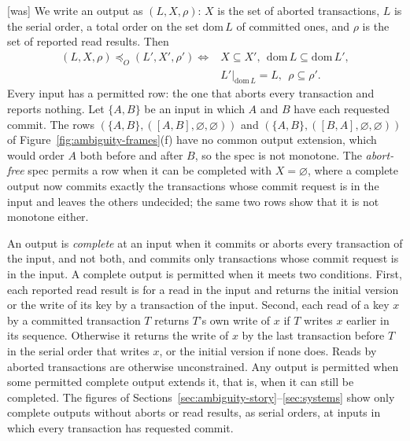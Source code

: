 \documentclass[sigconf]{cidr-2027}
\theoremstyle{remark}
\newcommand{\OutputOrd}{\preceq_O}
\newcommand{\outrel}{extends\xspace}          %
\newcommand{\outnoun}{output extension\xspace}%
\begin{document}
{\footnotesize\color{black!50}\noindent\textsf{[was]} We write an output as $(L,X,\rho)$: $X$ is the set of aborted transactions, $L$
is the serial order, a total order on the set $\mathrm{dom}\,L$ of committed
ones, and $\rho$ is the set of reported read results.  Then
\[
  \begin{aligned}
  (L,X,\rho)\OutputOrd(L',X',\rho')
  \iff{}& X\subseteq X',\ \ \mathrm{dom}\,L\subseteq\mathrm{dom}\,L',\\
         & L'|_{\mathrm{dom}\,L}=L,\ \ \rho\subseteq\rho'.
  \end{aligned}
\]
Every input has a permitted row: the one that aborts every transaction and
reports nothing.  Let $\{A,B\}$ be an input in which $A$ and $B$ have each
requested commit.  The rows $(\{A,B\},([A,B],\varnothing,\varnothing))$ and
$(\{A,B\},([B,A],\varnothing,\varnothing))$ of
Figure~\ref{fig:ambiguity-frames}(f) have no common \outnoun, which would order
$A$ both before and after $B$, so the spec is not monotone.  The
\emph{abort-free} spec permits a row when it can be completed with
$X=\varnothing$, where a complete output now commits exactly the transactions
whose commit request is in the input and leaves the others undecided; the same
two rows show that it is not monotone either.\par}

\color{blue!70!black}An output is \emph{complete} at an input when it commits or aborts every
transaction of the input, and not both, and commits only transactions whose
commit request is in the input.  A complete output is permitted when it meets two
conditions.  First, each reported read result is for a read in the input and
returns the initial version or the write of its key by a transaction of the
input.  Second, each read of a key $x$ by a committed transaction $T$ returns
$T$'s own write of $x$ if $T$ writes $x$ earlier in its sequence.  Otherwise it
returns the write of $x$ by the last transaction before $T$ in the serial order
that writes $x$, or the initial version if none does.  Reads by aborted
transactions are otherwise unconstrained.  Any output is permitted when some permitted complete output
\outrel it, that is, when it can still be completed.  The figures of
Sections~\ref{sec:ambiguity-story}--\ref{sec:systems} show only complete
outputs without aborts or read results, as serial orders, at inputs in which
every transaction has requested commit.\color{black}
\end{document}

